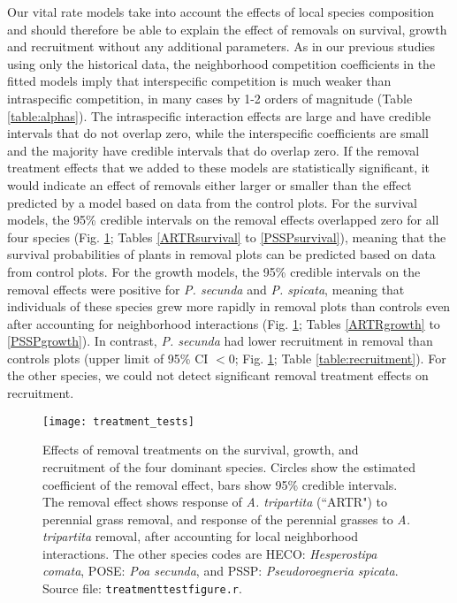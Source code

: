 \documentclass[11pt]{article}
\begin{document}
\begin{doublespacing}
Our vital rate models take into account the effects of local species composition and should therefore be able 
to explain the effect of removals on survival, growth and recruitment without any additional parameters. 
As in our previous studies using only the historical data, the neighborhood competition coefficients in the 
fitted models imply that interspecific competition is much weaker than intraspecific competition, in many
cases by 1-2 orders of magnitude (Table \ref{table:alphas}).  The intraspecific interaction effects are large and have credible intervals that 
do not overlap zero, while the interspecific coefficients are small and the majority have credible intervals that do overlap zero.
If the removal treatment effects that we added to these models are statistically significant, it would indicate an effect of 
removals either larger or smaller than the effect predicted by a model based on data from the control plots. 
For the survival models, the 95\% credible intervals on the removal effects overlapped zero for all four species (Fig. \ref{fig:VitalRateTest}; 
Tables \ref{ARTRsurvival} to \ref{PSSPsurvival}), meaning that the survival probabilities of plants in removal plots can be predicted based on data 
from control plots. For the growth models, the 95\% credible intervals on the removal effects were positive for \textit{P. secunda}  and \textit{P. spicata},
 meaning that individuals of these species grew more rapidly in removal plots than controls even after accounting for neighborhood interactions 
 (Fig. \ref{fig:VitalRateTest}; Tables \ref{ARTRgrowth} to \ref{PSSPgrowth}). In contrast, \textit{P. secunda} had lower recruitment in removal 
 than controls plots (upper limit of 95\% CI $<0$; Fig. \ref{fig:VitalRateTest}; Table \ref{table:recruitment}). For the other species, 
 we could not detect significant removal treatment effects on recruitment. 

 \begin{figure}[tbp]
 \centering
 \texttt{[image: treatment\_tests]}
 \caption{Effects of removal treatments on the survival, growth, and recruitment of the four dominant species. Circles show the estimated coefficient of the removal effect, bars show 95\% credible intervals. The removal effect shows response of \textit{A. tripartita} (``ARTR") to perennial grass removal, and response of the perennial grasses to \textit{A. tripartita} removal, after accounting for local neighborhood interactions. The other species codes are HECO: \textit{Hesperostipa comata}, POSE: \textit{Poa secunda}, and PSSP: \textit{Pseudoroegneria spicata}.
 Source file: \texttt{treatment\textunderscore test\textunderscore figure.r}.}
 \label{fig:VitalRateTest}
 \end{figure}


\end{doublespacing}
\end{document}
